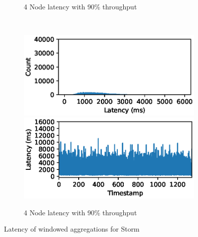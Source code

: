 \begin{figure}
\begin{subfigure}[b]{0.3\textwidth}
        \caption{4 Node latency with 90\% throughput }
    \end{subfigure}
    ~ 
    \begin{subfigure}[b]{0.3\textwidth}
        \includegraphics[width=\textwidth]{eps/storm_agg_8node_th_90_hist}
         \includegraphics[width=\textwidth]{eps/storm_agg_8node_th_90_ts}

        \caption{4 Node latency with 90\% throughput }
    \end{subfigure}




        \caption{Latency of windowed aggregations for Storm}
\end{figure}